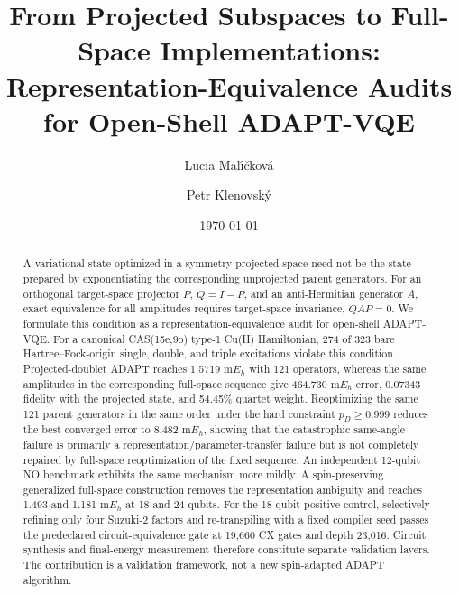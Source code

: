 \documentclass[
 aip,
 jcp,
 amsmath,amssymb,
 preprint
]{revtex4-2}
\begin{document}
\title{From Projected Subspaces to Full-Space Implementations:
Representation-Equivalence Audits for Open-Shell ADAPT-VQE}

\author{Lucia Mal\'{\i}\v{c}kov\'a}

\author{Petr Klenovsk\'y}

\date{\today}

\begin{abstract}
A variational state optimized in a symmetry-projected space need not be the state prepared by exponentiating the corresponding unprojected parent generators.
For an orthogonal target-space projector $P$, $Q=I-P$, and an anti-Hermitian generator $A$, exact equivalence for all amplitudes requires target-space invariance, $QAP=0$.
We formulate this condition as a representation-equivalence audit for open-shell ADAPT-VQE.
For a canonical CAS(15e,9o) type-1 Cu(II) Hamiltonian, 274 of 323 bare Hartree--Fock-origin single, double, and triple excitations violate this condition.
Projected-doublet ADAPT reaches 1.5719 m$E_h$ with 121 operators, whereas the same amplitudes in the corresponding full-space sequence give 464.730 m$E_h$ error, 0.07343 fidelity with the projected state, and 54.45\% quartet weight.
Reoptimizing the same 121 parent generators in the same order under the hard constraint $p_D\ge0.999$ reduces the best converged error to 8.482 m$E_h$, showing that the catastrophic same-angle failure is primarily a representation/parameter-transfer failure but is not completely repaired by full-space reoptimization of the fixed sequence.
An independent 12-qubit NO benchmark exhibits the same mechanism more mildly.
A spin-preserving generalized full-space construction removes the representation ambiguity and reaches 1.493 and 1.181 m$E_h$ at 18 and 24 qubits.
For the 18-qubit positive control, selectively refining only four Suzuki-2 factors and re-transpiling with a fixed compiler seed passes the predeclared circuit-equivalence gate at 19,660 CX gates and depth 23,016.
Circuit synthesis and final-energy measurement therefore constitute separate validation layers.
The contribution is a validation framework, not a new spin-adapted ADAPT algorithm.
\end{abstract}
\end{document}
